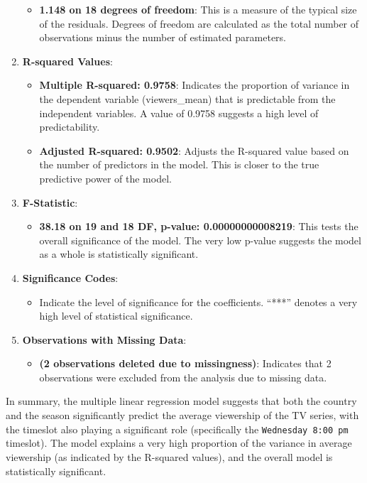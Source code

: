 \documentclass[
]{book}
\providecommand{\tightlist}{%
  \setlength{\itemsep}{0pt}\setlength{\parskip}{0pt}}
\begin{document}
\begin{enumerate}
  \begin{itemize}
  \tightlist
  \item
    \textbf{1.148 on 18 degrees of freedom}: This is a measure of the typical size of the residuals. Degrees of freedom are calculated as the total number of observations minus the number of estimated parameters.
  \end{itemize}
\item
  \textbf{R-squared Values}:

  \begin{itemize}
  \tightlist
  \item
    \textbf{Multiple R-squared: 0.9758}: Indicates the proportion of variance in the dependent variable (viewers\_mean) that is predictable from the independent variables. A value of 0.9758 suggests a high level of predictability.
  \item
    \textbf{Adjusted R-squared: 0.9502}: Adjusts the R-squared value based on the number of predictors in the model. This is closer to the true predictive power of the model.
  \end{itemize}
\item
  \textbf{F-Statistic}:

  \begin{itemize}
  \tightlist
  \item
    \textbf{38.18 on 19 and 18 DF, p-value: 0.00000000008219}: This tests the overall significance of the model. The very low p-value suggests the model as a whole is statistically significant.
  \end{itemize}
\item
  \textbf{Significance Codes}:

  \begin{itemize}
  \tightlist
  \item
    Indicate the level of significance for the coefficients. ``***'' denotes a very high level of statistical significance.
  \end{itemize}
\item
  \textbf{Observations with Missing Data}:

  \begin{itemize}
  \tightlist
  \item
    \textbf{(2 observations deleted due to missingness)}: Indicates that 2 observations were excluded from the analysis due to missing data.
  \end{itemize}
\end{enumerate}

In summary, the multiple linear regression model suggests that both the country and the season significantly predict the average viewership of the TV series, with the timeslot also playing a significant role (specifically the \texttt{Wednesday\ 8:00\ pm} timeslot). The model explains a very high proportion of the variance in average viewership (as indicated by the R-squared values), and the overall model is statistically significant.
\end{document}
